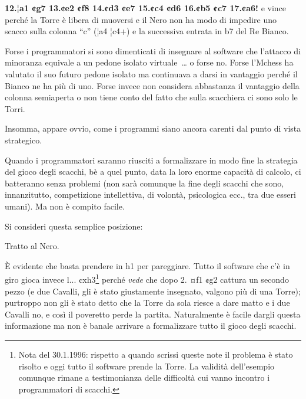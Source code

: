 \textbf{12.¦a1 ¢g7 13.¢e2 ¢f8 14.¢d3 ¢e7 15.¢c4 ¢d6 16.¢b5 ¢c7 17.¢a6!}
e vince perché la Torre è libera di muoversi e il Nero non ha modo di
impedire uno scacco sulla colonna ``c'' (¦a4 ¦c4+) e la successiva
entrata in b7 del Re Bianco.

Forse i programmatori si sono dimenticati di insegnare al software che
l'attacco di minoranza equivale a un pedone isolato virtuale~\ldots{} o
forse no. Forse l'Mchess ha valutato il suo futuro pedone isolato ma
continuava a darsi in vantaggio perché il Bianco ne ha più di uno. Forse
invece non considera abbastanza il vantaggio della colonna semiaperta o
non tiene conto del fatto che sulla scacchiera ci sono solo le Torri.

Insomma, appare ovvio, come i programmi siano ancora carenti dal punto
di vista strategico.

Quando i programmatori saranno riusciti a formalizzare in modo fine la
strategia del gioco degli scacchi, bè a quel punto, data la loro enorme
capacità di calcolo, ci batteranno senza problemi (non sarà comunque la
fine degli scacchi che sono, innanzitutto, competizione intellettiva, di
volontà, psicologica ecc., tra due esseri umani). Ma non è compito
facile.

Si consideri questa semplice posizione:


Tratto al Nero.

È evidente che basta prendere in h1 per pareggiare. Tutto il software
che c'è in giro gioca invece l... ¢xh3\footnote{Nota del 30.1.1996:
  rispetto a quando scrissi queste note il problema è stato risolto e
  oggi tutto il software prende la Torre. La validità dell'esempio
  comunque rimane a testimonianza delle difficoltà cui vanno incontro i
  programmatori di scacchi.} perché \emph{vede} che dopo 2. ¤f1 ¢g2
cattura un secondo pezzo (e due Cavalli, gli è stato giustamente
insegnato, valgono più di una Torre); purtroppo non gli è stato detto
che la Torre da sola riesce a dare matto e i due Cavalli no, e così il
poveretto perde la partita. Naturalmente è facile dargli questa
informazione ma non è banale arrivare a formalizzare tutto il gioco
degli scacchi.

